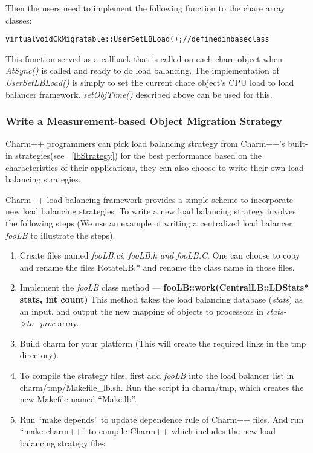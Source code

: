 Then the users need to implement the following function to the chare array
classes:

\begin{alltt}
   virtual void CkMigratable::UserSetLBLoad();      // defined in base class
\end{alltt}

This function served as a callback that is called on each chare object when
{\em AtSync()} is called and ready to do load balancing. The implementation of
{\em UserSetLBLoad()} is simply to set the current chare object's CPU load to
load balancer framework. {\em setObjTime()} described above can be used for
this.

\subsubsection{Write a Measurement-based Object Migration Strategy}
\label{writelb}

Charm++ programmers can pick load balancing strategy from Charm++'s built-in
strategies(see ~\ref{lbStrategy}) for the best performance based on the 
characteristics of their applications, they can also choose to write their 
own load balancing strategies.

Charm++ load balancing framework provides a simple scheme to incorporate new 
load balancing strategies. To write a new load balancing strategy
involves the following steps (We use an example of writing a centralized
load balancer {\em fooLB} to illustrate the steps).

\begin{enumerate}
\item Create files named {\em fooLB.ci, fooLB.h and fooLB.C}. One can choose to
copy and rename the files RotateLB.* and rename the class name in those files.

\item Implement the {\em fooLB} class method --- {\bf
fooLB::work(CentralLB::LDStats* stats, int count)} This method takes the load
balancing database ({\em stats}) as an input, and output the new mapping of
objects to processors in {\em stats->to\_proc} array.

\item Build charm for your platform (This will create the required links in the tmp directory).

\item To compile the strategy files, first add {\em fooLB} into the load
balancer list in charm/tmp/Makefile\_lb.sh. Run the script in charm/tmp, which
creates the new Makefile named ``Make.lb''.

\item Run ``make depends'' to update dependence rule of Charm++ files.  And run
``make charm++'' to compile Charm++ which includes the new load balancing
strategy files.
\end{enumerate}


